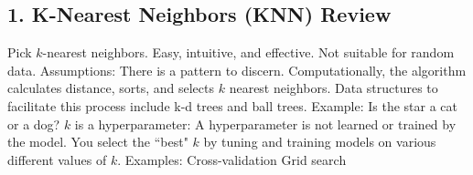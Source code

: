 
\begin{center}
\end{center}

\subsection*{1. K-Nearest Neighbors (KNN) Review}
\begin{outline}
    \1 Pick $k$-nearest neighbors.
    \1 Easy, intuitive, and effective.
    \1 Not suitable for random data.
    \1 Assumptions:
        \2 There is a pattern to discern.
        \2 Computationally, the algorithm calculates distance, sorts, and selects $k$ nearest neighbors.
        \2 Data structures to facilitate this process include k-d trees and ball trees.
        \2 Example: Is the star a cat or a dog?
    \1 $k$ is a hyperparameter:
        \2 A hyperparameter is not learned or trained by the model.
        \2 You select the ``best" $k$ by tuning and training models on various different values of $k$.
        \2 Examples:
            \3 Cross-validation
            \3 Grid search
\end{outline}

